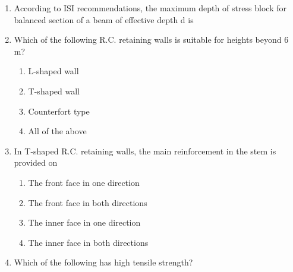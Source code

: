 \documentclass[11pt,a4paper]{article}
\begin{document}
\begin{enumerate}
{ii) to decrease shrinkage \\

iii) to increase setting time \\

iv) to decrease setting time \\

The correct answer is}
\\
\item{According to ISI recommendations, the maximum depth of stress block for balanced section of a beam of effective depth d is}
\\
\item{Which of the following R.C. retaining walls is suitable for heights beyond 6 m?}
\begin{enumerate}[label=\Alph*.]
\item{L-shaped wall}
\item{T-shaped wall}
\item{Counterfort type}
\item{All of the above}
\end{enumerate}
\item{In T-shaped R.C. retaining walls, the main reinforcement in the stem is provided on}
\begin{enumerate}[label=\Alph*.]
\item{The front face in one direction}
\item{The front face in both directions}
\item{The inner face in one direction}
\item{The inner face in both directions}
\end{enumerate}
\item{Which of the following has high tensile strength?}
\begin{enumerate}[label=\Alph*.]

\end{enumerate}
\end{enumerate}
\end{document}
